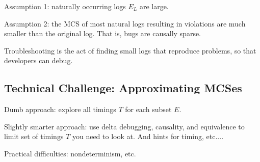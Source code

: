 Assumption 1: naturally occurring  logs $E_L$ are large.

Assumption 2: the MCS of most natural logs resulting in violations are much smaller than the original log.  That is, bugs are causally sparse.

Troubleshooting is the act of finding small logs that reproduce problems, so that developers can debug.

\subsection{Technical Challenge: Approximating MCSes}


\begin{outline}
\1 Dumb approach: explore all timings $T$ for each subset $E$.

\1 Slightly smarter approach: use delta debugging, causality, and equivalence to limit set of timings $T$ you need to look at.  And hints for timing, etc....

\1 Practical difficulties: nondeterminism, etc.
\end{outline}

